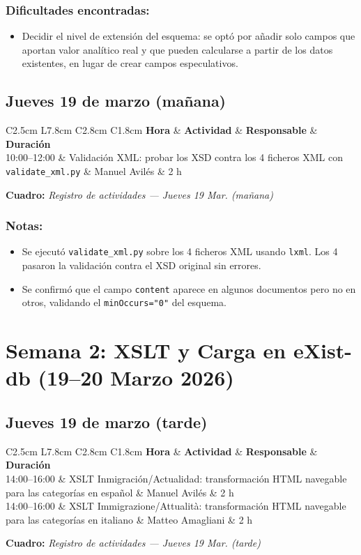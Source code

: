\documentclass[11pt,a4paper]{article}
\newcommand{\notetitle}[1]{\subsubsection*{#1}}
\newcommand{\activitytable}[2]{%
  \begin{center}
  \begin{tabular}{C{2.5cm} L{7.8cm} C{2.8cm} C{1.8cm}}
  \toprule
  \rowcolor{white}
  \textbf{Hora} & \textbf{Actividad} & \textbf{Responsable} & \textbf{Duración} \\
  \midrule
  #1
  \bottomrule
  \end{tabular}
  \end{center}
  \vspace{-4pt}
  {\small\textbf{Cuadro:} \textit{#2}}
  \vspace{6pt}
}
\begin{document}
\notetitle{Dificultades encontradas:}
\begin{itemize}
  \item Decidir el nivel de extensión del esquema: se optó por añadir solo campos que aportan valor analítico real y que pueden calcularse a partir de los datos existentes, en lugar de crear campos especulativos.
\end{itemize}

\subsection{Jueves 19 de marzo (mañana)}

\activitytable{%
  10:00--12:00 & Validación XML: probar los XSD contra los 4 ficheros XML con \texttt{validate\_xml.py} & Manuel Avilés & 2 h \\
}{Registro de actividades --- Jueves 19 Mar. (mañana)}

\notetitle{Notas:}
\begin{itemize}
  \item Se ejecutó \texttt{validate\_xml.py} sobre los 4 ficheros XML usando \texttt{lxml}. Los 4 pasaron la validación contra el XSD original sin errores.
  \item Se confirmó que el campo \texttt{content} aparece en algunos documentos pero no en otros, validando el \texttt{minOccurs="0"} del esquema.
\end{itemize}

\newpage

\section{Semana 2: XSLT y Carga en eXist-db (19--20 Marzo 2026)}

\subsection{Jueves 19 de marzo (tarde)}

\activitytable{%
  14:00--16:00 & XSLT Inmigración/Actualidad: transformación HTML navegable para las categorías en español & Manuel Avilés & 2 h \\
  \rowcolor{tablegray}
  14:00--16:00 & XSLT Immigrazione/Attualità: transformación HTML navegable para las categorías en italiano & Matteo Amagliani & 2 h \\
}{Registro de actividades --- Jueves 19 Mar. (tarde)}
\end{document}
